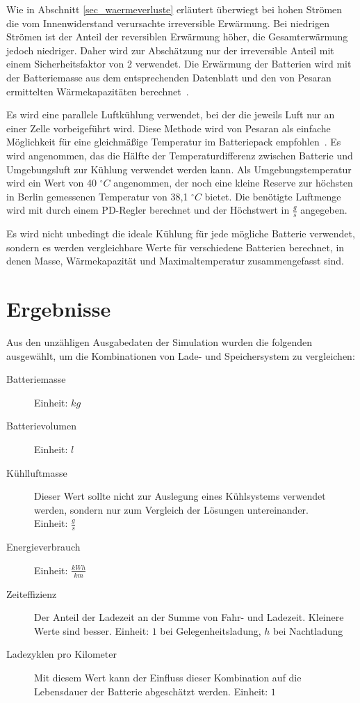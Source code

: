 Wie in Abschnitt \ref{sec_waermeverluste} erläutert überwiegt bei hohen Strömen die vom Innenwiderstand verursachte irreversible Erwärmung. Bei niedrigen Strömen ist der Anteil der reversiblen Erwärmung höher, die Gesamterwärmung jedoch niedriger. Daher wird zur Abschätzung nur der irreversible Anteil mit einem Sicherheitsfaktor von 2 verwendet. Die Erwärmung der Batterien wird mit der Batteriemasse aus dem entsprechenden Datenblatt und den von Pesaran ermittelten Wärmekapazitäten berechnet~\cite{pesaran2001battery}.

Es wird eine parallele Luftkühlung verwendet, bei der die jeweils Luft nur an einer Zelle vorbeigeführt wird. Diese Methode wird von Pesaran als einfache Möglichkeit für eine gleichmäßige Temperatur im Batteriepack empfohlen~\cite{pesaran2001battery}. Es wird angenommen, das die Hälfte der Temperaturdifferenz zwischen Batterie und Umgebungsluft zur Kühlung verwendet werden kann. Als Umgebungstemperatur wird ein Wert von 40 $^{\circ}C$ angenommen, der noch eine kleine Reserve zur höchsten in Berlin gemessenen Temperatur von 38,1 $^{\circ}C$ bietet\cite{tempRekord}. Die benötigte Luftmenge wird mit durch einem PD-Regler berechnet und der Höchstwert in $\frac{g}{s}$ angegeben.

Es wird nicht unbedingt die ideale Kühlung für jede mögliche Batterie verwendet, sondern es werden vergleichbare Werte für verschiedene Batterien berechnet, in denen Masse, Wärmekapazität und Maximaltemperatur zusammengefasst sind.

\section{Ergebnisse}

Aus den unzähligen Ausgabedaten der Simulation wurden die folgenden ausgewählt, um die Kombinationen von Lade- und Speichersystem zu vergleichen:
\begin{description}
	\item[Batteriemasse] Einheit: $kg$
	\item[Batterievolumen] Einheit: $l$
	\item[Kühlluftmasse] Dieser Wert sollte nicht zur Auslegung eines Kühlsystems verwendet werden, sondern nur zum Vergleich der Lösungen untereinander.\\
	Einheit: $\frac{g}{s}$
	\item[Energieverbrauch] Einheit: $\frac{kWh}{km}$
	\item[Zeiteffizienz] Der Anteil der Ladezeit an der Summe von Fahr- und Ladezeit. Kleinere Werte sind besser.
	Einheit: $1$ bei Gelegenheitsladung, $h$ bei Nachtladung
	\item[Ladezyklen pro Kilometer] Mit diesem Wert kann der Einfluss dieser Kombination auf die Lebensdauer der Batterie abgeschätzt werden.
	Einheit: $1$
\end{description}

